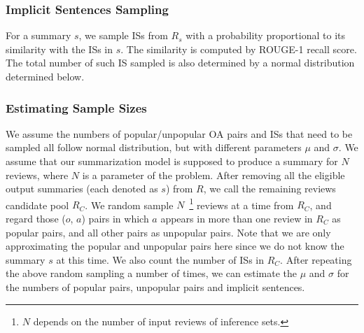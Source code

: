 %

\subsubsection{Implicit Sentences Sampling}
\label{sec:ISsample}
For a summary $s$, 
we sample ISs from $R_s$ with a probability proportional to
its similarity with the ISs in $s$. The similarity is computed by  
ROUGE-1 recall score. The total number of such IS sampled is also
determined by a normal distribution determined below.

\subsubsection{Estimating Sample Sizes}
\label{sec:gauss}
We assume the numbers of popular/unpopular OA pairs and ISs that need to be 
sampled all follow normal distribution, but with different parameters $\mu$ and $\sigma$. 
We assume that our summarization model is supposed to produce a summary for $N$ reviews,
where $N$ is a parameter of the problem. After removing all the eligible output summaries
(each denoted as $s$) from $R$, we call the remaining reviews candidate pool $R_C$. 
We random sample $N$~\footnote{$N$ depends on the number of input reviews of inference sets.}
reviews at a time from $R_C$, and regard those ($o$, $a$) 
pairs in which $a$ appears in more than one review in $R_C$ as popular pairs,
and all other pairs as unpopular pairs. 
Note that we are only approximating the popular
and unpopular pairs here since we do not know the summary $s$ at this time.
We also count the number of ISs in $R_C$. 
After repeating the above random sampling a number of times, we can estimate the $\mu$ and
$\sigma$ for the numbers of popular pairs, unpopular pairs and implicit sentences.

